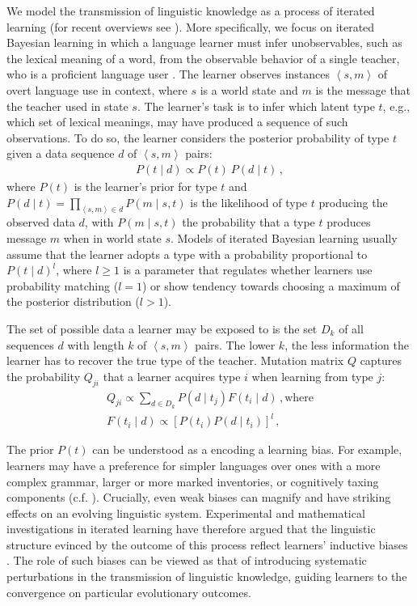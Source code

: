 \documentclass[10pt,a4paper]{article}
\newcommand{\tuple}[1]{\ensuremath{\left\langle #1 \right\rangle}}
\begin{document}
We model the transmission of linguistic knowledge as a process of iterated learning (for recent
overviews see \citealt{kirby+etal:2014, tamariz+kirby:2016}). More specifically, we focus on
iterated Bayesian learning in which a language learner must infer unobservables, such as the
lexical meaning of a word, from the observable behavior of a single teacher, who is a
proficient language user \citep[e.g.][]{griffiths+kalish:2007,kirby+etal:2007}. The learner
observes instances $\tuple{s,m}$ of overt language use in context, where $s$ is a world state
and $m$ is the message that the teacher used in state $s$. The learner's task is to infer which
latent type $t$, e.g., which set of lexical meanings, may have produced a sequence of such
observations. To do so, the learner considers the posterior probability of type $t$ given a
data sequence $d$ of $\tuple{s, m}$ pairs:
\begin{align*}
  P(t \mid d) \propto P(t) \ P(d \mid t)\,,
\end{align*}
where $P(t)$ is the learner's prior for type $t$ and
$P(d \mid t) = \prod_{\tuple{s,m} \in d} P(m \mid s, t)$ is the likelihood of type $t$
producing the observed data $d$, with $P(m \mid s, t)$ the probability that a type $t$ produces
message $m$ when in world state $s$. Models of iterated Bayesian learning usually assume that
the learner adopts a type with a probability proportional to $P(t \mid d)^l$, where $l \ge 1$
is a parameter that regulates whether learners use probability matching ($l = 1$) or show
tendency towards choosing a maximum of the posterior distribution ($l > 1$). 

The set of possible data a learner may be exposed to is the set $D_k$ of all sequences $d$ with
length $k$ of $\tuple{s,m}$ pairs. The lower $k$, the less information the learner has to
recover the true type of the teacher. Mutation matrix $Q$ captures the probability $Q_{ji}$
that a learner acquires type $i$ when learning from type $j$:
\begin{align*}
  Q_{ji} \propto \sum_{d \in D_k} P(d \mid t_j) F(t_i \mid d)\,, \text{where} \\
  F(t_i \mid d) \propto [P(t_i) P(d \mid t_i)]^l\,,
\end{align*}


The prior $P(t)$ can be understood as a encoding a learning bias. For example, learners may
have a preference for simpler languages over ones with a more complex grammar, larger or more
marked inventories, or cognitively taxing components
(c.f. \citealt{feldman:2000,chater+vitanyi:2003, kirby+etal:2015}). Crucially, even weak biases
can magnify and have striking effects on an evolving linguistic system. Experimental and
mathematical investigations in iterated learning have therefore argued that the linguistic
structure evinced by the outcome of this process reflect learners' inductive biases
\citep{kirby+etal:2007,kirby+etal:2014}. The role of such biases can be viewed as that of
introducing systematic perturbations in the transmission of linguistic knowledge, guiding
learners to the convergence on particular evolutionary outcomes.
\end{document}
